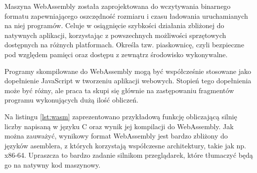 \documentclass[language=polish,type=master]{aghmodern}
\begin{document}
Maszyna WebAssembly została zaprojektowana do wczytywania binarnego formatu zapewniającego oszczędność rozmiaru i czasu ładowania uruchamianych na niej programów.
Celuje w osiągnięcie szybkości działania zbliżonej do natywnych aplikacji, korzystając z powszechnych możliwości sprzętowych\footnotemark{} dostępnych na różnych platformach.
Określa tzw. piaskownicę\footnotemark{}, czyli bezpieczne pod względem pamięci oraz dostępu z zewnątrz środowisko wykonywalne.

Programy skompilowane do WebAssembly mogą być współcześnie stosowane jako dopełnienie JavaScript w tworzeniu aplikacji webowych.
Stopień tego dopełnienia może być różny, ale praca ta skupi się głównie na zastępowaniu fragmentów programu wykonujących dużą ilość obliczeń.

Na listingu \ref{lst:wasm} zaprezentowano przykładową funkcję obliczającą silnię liczby napisaną w języku C oraz wynik jej kompilacji do WebAssembly.
Jak można zauważyć, wynikowy format WebAssembly jest bardzo zbliżony do języków asemblera, z których korzystają współczesne architektury, takie jak np. x86-64.
Upraszcza to bardzo zadanie silnikom przeglądarek, które tłumaczyć będą go na natywny kod maszynowy.
\end{document}

